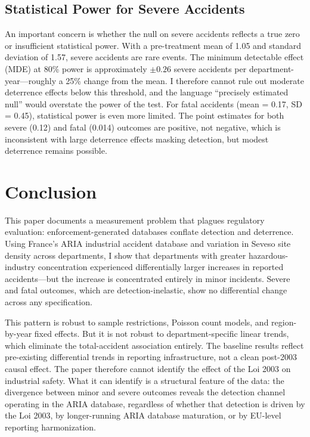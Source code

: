 \documentclass[12pt]{article}
\begin{document}
\subsection{Statistical Power for Severe Accidents}

An important concern is whether the null on severe accidents reflects a true zero or insufficient statistical power. With a pre-treatment mean of 1.05 and standard deviation of 1.57, severe accidents are rare events. The minimum detectable effect (MDE) at 80\% power is approximately $\pm 0.26$ severe accidents per department-year---roughly a 25\% change from the mean. I therefore cannot rule out moderate deterrence effects below this threshold, and the language ``precisely estimated null'' would overstate the power of the test. For fatal accidents (mean = 0.17, SD = 0.45), statistical power is even more limited. The point estimates for both severe (0.12) and fatal (0.014) outcomes are positive, not negative, which is inconsistent with large deterrence effects masking detection, but modest deterrence remains possible.


\section{Conclusion}
\label{sec:conclusion}

This paper documents a measurement problem that plagues regulatory evaluation: enforcement-generated databases conflate detection and deterrence. Using France's ARIA industrial accident database and variation in Seveso site density across departments, I show that departments with greater hazardous-industry concentration experienced differentially larger increases in reported accidents---but the increase is concentrated entirely in minor incidents. Severe and fatal outcomes, which are detection-inelastic, show no differential change across any specification.

This pattern is robust to sample restrictions, Poisson count models, and region-by-year fixed effects. But it is not robust to department-specific linear trends, which eliminate the total-accident association entirely. The baseline results reflect pre-existing differential trends in reporting infrastructure, not a clean post-2003 causal effect. The paper therefore cannot identify the effect of the Loi 2003 on industrial safety. What it can identify is a structural feature of the data: the divergence between minor and severe outcomes reveals the detection channel operating in the ARIA database, regardless of whether that detection is driven by the Loi 2003, by longer-running ARIA database maturation, or by EU-level reporting harmonization.
\end{document}
